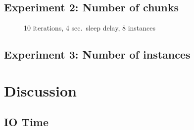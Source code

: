\documentclass[conference]{IEEEtran}
\begin{document}
\subsection{Experiment 2: Number of chunks}

\begin{figure}[!t]
    \centering
    
    \caption{10 iterations, 4 sec.\ sleep delay, 8 instances}\label{fig:histo_chunk}
\end{figure}

\subsection{Experiment 3: Number of instances}



\section{Discussion}
\subsection{IO Time}
\end{document}
